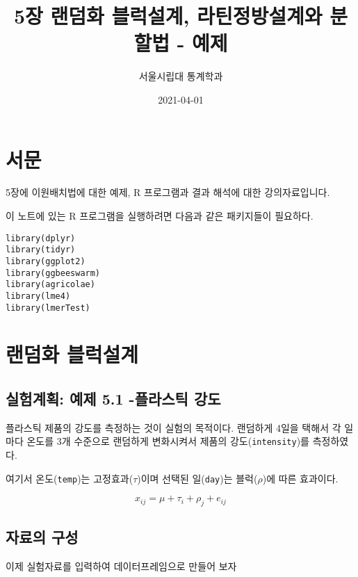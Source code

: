\documentclass[
]{book}
\title{5장 랜덤화 블럭설계, 라틴정방설계와 분할법 - 예제}
\author{서울시립대 통계학과}
\date{2021-04-01}
\begin{document}
\maketitle

{
\setcounter{tocdepth}{1}
\tableofcontents
}
\hypertarget{uxc11cuxbb38}{%
\chapter*{서문}\label{uxc11cuxbb38}}


5장에 이원배치법에 대한 예제, R 프로그램과 결과 해석에 대한 강의자료입니다.

이 노트에 있는 R 프로그램을 실행하려면 다음과 같은 패키지들이 필요하다.

\begin{verbatim}
library(dplyr)
library(tidyr)
library(ggplot2)
library(ggbeeswarm)
library(agricolae)
library(lme4)
library(lmerTest)
\end{verbatim}

\mainmatter

\hypertarget{ex51}{%
\chapter{랜덤화 블럭설계}\label{ex51}}

\hypertarget{uxc2e4uxd5d8uxacc4uxd68d-uxc608uxc81c-5.1--uxd50cuxb77cuxc2a4uxd2f1-uxac15uxb3c4}{%
\section{실험계획: 예제 5.1 -플라스틱 강도}\label{uxc2e4uxd5d8uxacc4uxd68d-uxc608uxc81c-5.1--uxd50cuxb77cuxc2a4uxd2f1-uxac15uxb3c4}}

플라스틱 제품의 강도를 측정하는 것이 실험의 목적이다. 랜덤하게 4일을 택해서 각 일마다 온도를 3개 수준으로 랜덤하게 변화시켜서 제품의 강도(\texttt{intensity})를 측정하였다.

여기서 온도(\texttt{temp})는 고정효과(\(\tau\))이며 선택된 일(\texttt{day})는 블럭(\(\rho\))에 따른 효과이다.

\[ x_{ij} = \mu + \tau_i + \rho_j + e_{ij} \]

\hypertarget{uxc790uxb8ccuxc758-uxad6cuxc131}{%
\section{자료의 구성}\label{uxc790uxb8ccuxc758-uxad6cuxc131}}

이제 실험자료를 입력하여 데이터프레임으로 만들어 보자
\end{document}
